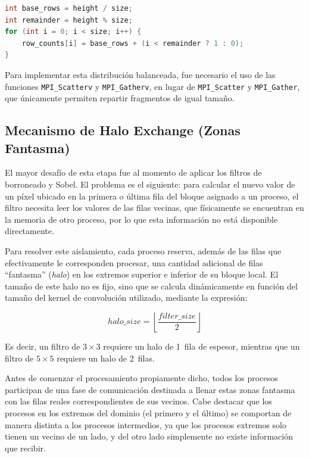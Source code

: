 \begin{lstlisting}[language=C, caption={Descomposición de dominio 1D con distribución balanceada}, label=list:domain_decomp]
int base_rows = height / size;
int remainder = height % size;
for (int i = 0; i < size; i++) {
    row_counts[i] = base_rows + (i < remainder ? 1 : 0);
}
\end{lstlisting}

Para implementar esta distribución balanceada, fue necesario el uso de las funciones \texttt{MPI\_Scatterv} y \texttt{MPI\_Gatherv}, en lugar de \texttt{MPI\_Scatter} y \texttt{MPI\_Gather}, que únicamente permiten repartir fragmentos de igual tamaño.


\subsection{Mecanismo de Halo Exchange (Zonas Fantasma)}

El mayor desafío de esta etapa fue al momento de aplicar los filtros de borroneado y Sobel. El problema es el siguiente: para calcular el nuevo valor de un píxel ubicado en la primera o última fila del bloque asignado a un proceso, el filtro necesita leer los valores de las filas vecinas, que físicamente se encuentran en la memoria de otro proceso, por lo que esta información no está disponible directamente.

Para resolver este aislamiento, cada proceso reserva, además de las filas que efectivamente le corresponden procesar, una cantidad adicional de filas ``fantasma'' (\textit{halo}) en los extremos superior e inferior de su bloque local. El tamaño de este halo no es fijo, sino que se calcula dinámicamente en función del tamaño del kernel de convolución utilizado, mediante la expresión:

\begin{equation}
\label{eq:halo_size}
\mathit{halo\_size} = \left\lfloor \frac{\mathit{filter\_size}}{2} \right\rfloor
\end{equation}

Es decir, un filtro de $3 \times 3$ requiere un halo de 1~fila de espesor, mientras que un filtro de $5 \times 5$ requiere un halo de 2~filas.

Antes de comenzar el procesamiento propiamente dicho, todos los procesos participan de una fase de comunicación destinada a llenar estas zonas fantasma con las filas reales correspondientes de sus vecinos. Cabe destacar que los procesos en los extremos del dominio (el primero y el último) se comportan de manera distinta a los procesos intermedios, ya que los procesos extremos solo tienen un vecino de un lado, y del otro lado simplemente no existe información que recibir.


